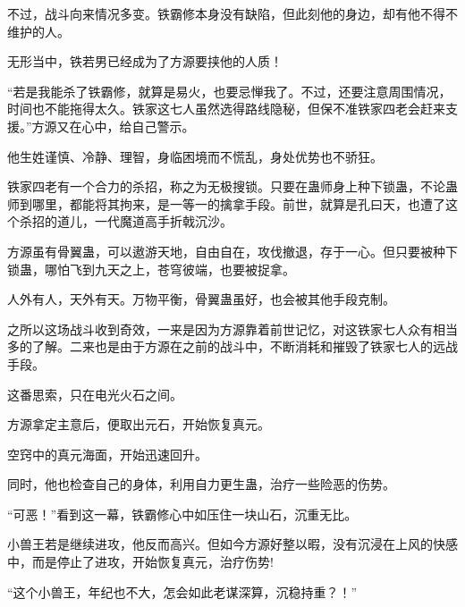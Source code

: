\begin{this_body}
不过，战斗向来情况多变。铁霸修本身没有缺陷，但此刻他的身边，却有他不得不维护的人。

无形当中，铁若男已经成为了方源要挟他的人质！

“若是我能杀了铁霸修，就算是易火，也要忌惮我了。不过，还要注意周围情况，时间也不能拖得太久。铁家这七人虽然选得路线隐秘，但保不准铁家四老会赶来支援。”方源又在心中，给自己警示。

他生姓谨慎、冷静、理智，身临困境而不慌乱，身处优势也不骄狂。

铁家四老有一个合力的杀招，称之为无极搜锁。只要在蛊师身上种下锁蛊，不论蛊师到哪里，都能将其拘来，是一等一的擒拿手段。前世，就算是孔曰天，也遭了这个杀招的道儿，一代魔道高手折戟沉沙。

方源虽有骨翼蛊，可以遨游天地，自由自在，攻伐撤退，存于一心。但只要被种下锁蛊，哪怕飞到九天之上，苍穹彼端，也要被捉拿。

人外有人，天外有天。万物平衡，骨翼蛊虽好，也会被其他手段克制。

之所以这场战斗收到奇效，一来是因为方源靠着前世记忆，对这铁家七人众有相当多的了解。二来也是由于方源在之前的战斗中，不断消耗和摧毁了铁家七人的远战手段。

这番思索，只在电光火石之间。

方源拿定主意后，便取出元石，开始恢复真元。

空窍中的真元海面，开始迅速回升。

同时，他也检查自己的身体，利用自力更生蛊，治疗一些险恶的伤势。

“可恶！”看到这一幕，铁霸修心中如压住一块山石，沉重无比。

小兽王若是继续进攻，他反而高兴。但如今方源好整以暇，没有沉浸在上风的快感中，而是停止了进攻，开始恢复真元，治疗伤势!

“这个小兽王，年纪也不大，怎会如此老谋深算，沉稳持重？！”

\end{this_body}

